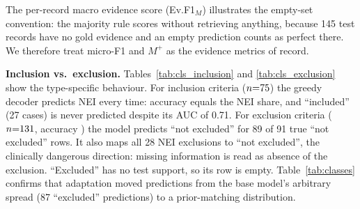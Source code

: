 The per-record macro evidence score (Ev.F1$_M$) illustrates the empty-set convention: the majority rule scores \TestMajEvM{} without retrieving anything, because 145 test records have no gold evidence and an empty prediction counts as perfect there. We therefore treat micro-F1 and $M^{+}$ as the evidence metrics of record.

\textbf{Inclusion vs.\ exclusion.} Tables~\ref{tab:cls_inclusion} and \ref{tab:cls_exclusion} show the type-specific behaviour. For inclusion criteria ($n{=}75$) the greedy decoder predicts NEI every time: accuracy \InclusionAcc{} equals the NEI share, and ``included'' (27 cases) is never predicted despite its AUC of 0.71. For exclusion criteria ($n{=}131$, accuracy \ExclusionAcc) the model predicts ``not excluded'' for 89 of 91 true ``not excluded'' rows. It also maps all 28 NEI exclusions to ``not excluded'', the clinically dangerous direction: missing information is read as absence of the exclusion. ``Excluded'' has no test support, so its row is empty. Table~\ref{tab:classes} confirms that adaptation moved predictions from the base model's arbitrary spread (87 ``excluded'' predictions) to a prior-matching distribution.

